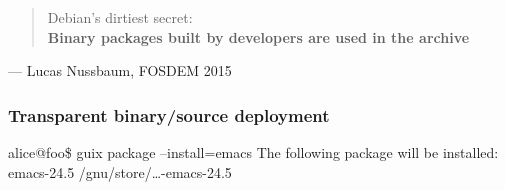 \documentclass{beamer}
\begin{document}
\begin{frame}[plain]
  \begin{quotation}
    \noindent
    \Large{Debian’s dirtiest secret:\\
      \noindent
      \textbf{Binary packages \alert{built by developers} are used in
        the archive}}
  \end{quotation}
  \hfill{ --- Lucas Nussbaum, FOSDEM 2015}
\end{frame}


\begin{frame}[fragile]
  \frametitle{Transparent binary/source deployment}
  \begin{overlayarea}{\textwidth}{6cm}
    \begin{semiverbatim}
alice@foo\$ \alert{guix package --install=}emacs
The following package will be installed:
   emacs-24.5	/gnu/store/\dots{}-emacs-24.5
    \end{semiverbatim}
  \end{overlayarea}
\end{frame}
\end{document}
